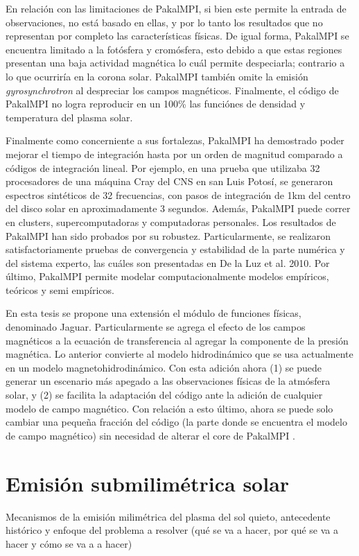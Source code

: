 \documentclass[9pt]{book}
\begin{document}
En relaci\'on con las limitaciones de PakalMPI, si bien este permite la entrada de observaciones, no est\'a basado en ellas, y por lo tanto los resultados que no representan por completo las caracter\'isticas f\'isicas. De igual forma, PakalMPI se encuentra limitado a la fot\'osfera y crom\'osfera, esto debido a que estas regiones presentan una baja actividad magn\'etica lo cu\'al permite despeciarla; contrario a lo que ocurrir\'ia en la corona solar. PakalMPI tambi\'en omite la emisi\'on \emph{gyrosynchrotron} al despreciar los campos magn\'eticos. Finalmente, el c\'odigo de PakalMPI no logra reproducir en un 100\% las funci\'ones de densidad y temperatura del plasma solar.
 
Finalmente como concerniente a sus fortalezas, PakalMPI ha demostrado poder mejorar el tiempo de integraci\'on hasta por un orden de magnitud comparado a c\'odigos de integraci\'on lineal. Por ejemplo, en una prueba que utilizaba 32 procesadores de una m\'aquina Cray del CNS en san Luis Potos\'i, se generaron espectros sint\'eticos de 32 frecuencias, con pasos de integraci\'on de 1km del centro del disco solar en aproximadamente 3 segundos. Adem\'as, PakalMPI puede correr en clusters, supercomputadoras y computadoras personales. Los resultados de PakalMPI han sido probados por su robustez. Particularmente, se realizaron satisfactoriamente pruebas de convergencia y estabilidad de la parte num\'erica y del sistema experto, las cu\'ales son presentadas en De la Luz et al. 2010. Por \'ultimo, PakalMPI permite modelar computacionalmente modelos emp\'iricos, te\'oricos y semi emp\'iricos. 

En esta tesis se propone una extensi\'on el m\'odulo de funciones f\'isicas, denominado Jaguar. Particularmente se agrega el efecto de los campos magn\'eticos a la ecuaci\'on de transferencia al agregar la componente de la presi\'on magn\'etica. Lo anterior convierte al modelo hidrodin\'amico que se usa actualmente en un modelo magnetohidrodin\'amico. Con esta adici\'on ahora (1) se puede generar un escenario m\'as apegado a las observaciones f\'isicas de la atm\'osfera solar, y (2) se facilita la adaptaci\'on del c\'odigo ante la adici\'on de cualquier modelo de campo magn\'etico. Con relaci\'on a esto \'ultimo, ahora se puede solo cambiar una peque\~na fracci\'on del c\'odigo (la parte donde se encuentra el modelo de campo magn\'etico) sin necesidad de alterar el core de PakalMPI . 





\chapter{Emisi\'on submilim\'etrica solar}
Mecanismos de la emisi\'on milim\'etrica del plasma del sol quieto, antecedente hist\'orico y enfoque del problema a resolver (qu\'e se va a hacer, por qu\'e se va a hacer y c\'omo se va a a hacer)
\end{document}
